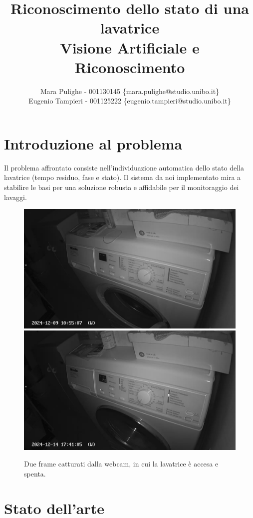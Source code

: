 \documentclass{article}
\title{
    Riconoscimento dello stato di una lavatrice \\
    \large Visione Artificiale e Riconoscimento
}
\author{Mara Pulighe - 001130145 \{mara.pulighe@studio.unibo.it\}\\
        Eugenio Tampieri - 001125222 \{eugenio.tampieri@studio.unibo.it\}}
\begin{document}
\maketitle


\section{Introduzione al problema}\label{introduzione-al-problema}

\par Il problema affrontato consiste nell'individuazione automatica dello
stato della lavatrice (tempo residuo, fase e stato). Il sistema da noi
implementato mira a stabilire le basi per una soluzione robusta e
affidabile per il monitoraggio dei lavaggi.

\begin{figure}[h!]
  \centering
  \includegraphics[scale=0.15]{1733738109}
  \includegraphics[scale=0.15]{1734194469R20}
  \caption{Due frame catturati dalla webcam, in cui la lavatrice è accesa e spenta.}
\end{figure}

\section{Stato dell'arte}\label{stato-dellarte}
\end{document}
